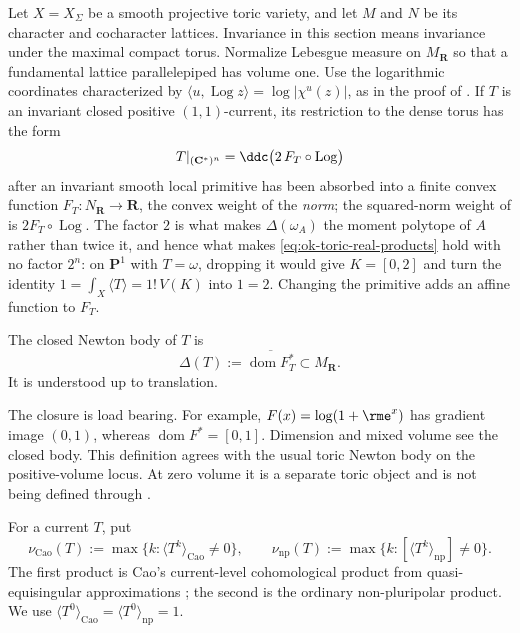 Let $X=X_\Sigma$ be a smooth projective toric variety, and let $M$ and
$N$ be its character and cocharacter lattices.  Invariance in this section
means invariance under the maximal compact torus.  Normalize Lebesgue measure
on $M_{\mathbf R}$ so that a fundamental lattice parallelepiped has volume
one.  Use the logarithmic coordinates characterized by
$\langle u,\operatorname{Log}z\rangle=\log|\chi^u(z)|$, as in the proof of
.  If $T$ is an invariant closed positive
$(1,1)$-current, its restriction to the dense torus has the form
\[
             T|_{(\mathbf C^*)^n}=\ddc\bigl(2\,F_T\circ\operatorname{Log}\bigr)
\]
after an invariant smooth local primitive has been absorbed into a finite
convex function $F_T:N_{\mathbf R}\to\mathbf R$, the convex weight of the
\emph{norm}; the squared-norm weight of  is
$2F_T\circ\operatorname{Log}$.  The factor $2$ is what makes
$\Delta(\omega_A)$ the moment polytope of $A$ rather than twice it, and
hence what makes \eqref{eq:ok-toric-real-products} hold with no factor
$2^n$: on $\mathbf P^1$ with $T=\omega$, dropping it would give
$K=[0,2]$ and turn the identity $1=\int_X\langle T\rangle=1!\,V(K)$ into
$1=2$.  Changing the primitive
adds an affine function to $F_T$.

\begin{definition}\label{def:ok-closed-newton-body}
The closed Newton body of $T$ is
\[
                 \Delta(T):=
                 \overline{\operatorname{dom}F_T^*}
                 \subset M_{\mathbf R}.
\tag{55.50}\label{eq:ok-closed-newton-body}
\]
It is understood up to translation.
\end{definition}

The closure is load bearing.  For example,
$F(x)=\log(1+\rme^x)$ has gradient image $(0,1)$, whereas
$\operatorname{dom}F^*=[0,1]$.  Dimension and mixed volume see the closed
body.  This definition agrees with the usual toric Newton body on the
positive-volume locus.  At zero volume it is a separate toric object and is
not being defined through .

For a current $T$, put
\[
 \nu_{\mathrm{Cao}}(T)
 :=\max\{k:\langle T^k\rangle_{\mathrm{Cao}}\ne0\},
 \qquad
 \nu_{\mathrm{np}}(T)
 :=\max\{k:[\langle T^k\rangle_{\mathrm{np}}]\ne0\}.
\]
The first product is Cao's current-level cohomological product from
quasi-equisingular approximations \cite[Definitions~2--3]{Cao14}; the second
is the ordinary non-pluripolar product.  We use
$\langle T^0\rangle_{\mathrm{Cao}}
=\langle T^0\rangle_{\mathrm{np}}=1$.

